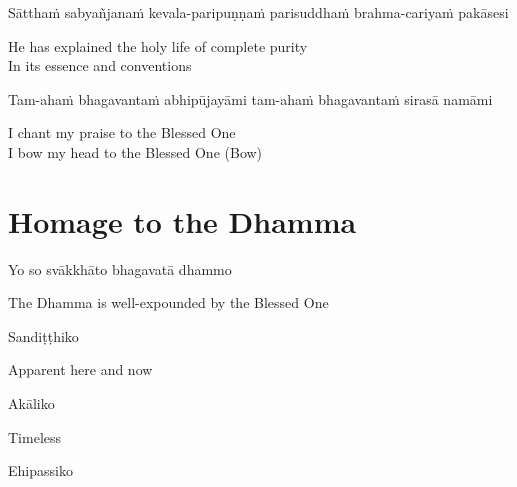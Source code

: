 \begin{pali-hang}
Sātthaṁ sabyañjanaṁ kevala-paripuṇṇaṁ parisuddhaṁ brahma-cariyaṁ pakāsesi
\end{pali-hang}

\begin{english}
  He has explained the holy life of complete purity\\
  In its essence and conventions
\end{english}

\begin{pali-hang}
Tam-ahaṁ bhagavantaṁ abhipūjayāmi tam-ahaṁ bhagavantaṁ sirasā namāmi
\end{pali-hang}

\begin{english}
  I chant my praise to the Blessed One\\
  I bow my head to the Blessed One \hfill{(Bow)}
\end{english}

\section{Homage to the Dhamma}
\label{homage-dhamma}

\begin{leader}
\end{leader}
\begin{leader}
\end{leader}

Yo so svākkhāto bhagavatā dhammo

\begin{english}
  The Dhamma is well-expounded by the Blessed One
\end{english}

Sandiṭṭhiko

\begin{english}
  Apparent here and now
\end{english}

Akāliko

\begin{english}
  Timeless
\end{english}

Ehipassiko

